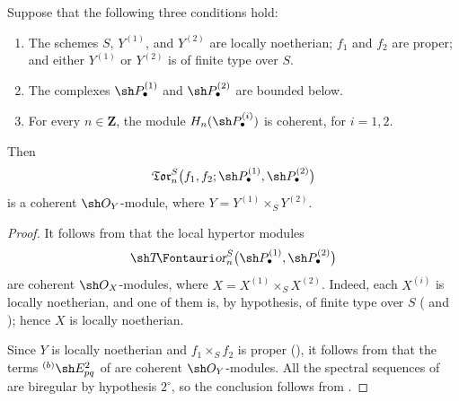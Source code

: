 \begin{proposition}[6.7.9]
\label{III.6.7.9}
Suppose that the following three conditions hold:
\begin{enumerate}
  \item[{$1^\circ$}]
    The schemes $S$, $Y^{(1)}$, and $Y^{(2)}$ are locally
    noetherian; $f_1$ and $f_2$ are proper; and either
    $Y^{(1)}$ or $Y^{(2)}$ is of finite type over $S$.
  \item[{$2^\circ$}]
    The complexes $\sh P_\bullet^{(1)}$ and
    $\sh P_\bullet^{(2)}$ are bounded below.
  \item[{$3^\circ$}]
    For every $n\in\mathbf Z$, the module
    $H_n(\sh P_\bullet^{(i)})$ is coherent, for $i=1,2$.
\end{enumerate}
Then
\[
  \mathfrak{Tor}_n^S
  \bigl(
    f_1,f_2;
    \sh P_\bullet^{(1)},\sh P_\bullet^{(2)}
  \bigr)
\]
is a coherent $\sh O_Y$-module, where
$Y=Y^{(1)}\times_SY^{(2)}$.
\end{proposition}

\begin{proof}
It follows from  that the local hypertor modules
\[
  \shTor_n^S
  \bigl(
    \sh P_\bullet^{(1)},\sh P_\bullet^{(2)}
  \bigr)
\]
are coherent $\sh O_X$-modules, where
$X=X^{(1)}\times_SX^{(2)}$.  Indeed, each $X^{(i)}$ is locally
noetherian, and one of them is, by hypothesis, of finite type over
$S$ ( and ); hence $X$ is
locally noetherian.

Since $Y$ is locally noetherian and
$f_1\times_Sf_2$ is proper (), it follows from
 that the terms ${}^{(b)}\sh E_{pq}^2$ of
 are coherent $\sh O_Y$-modules.  All the spectral
sequences of  are biregular by hypothesis
$2^\circ$, so the conclusion follows from
.
\end{proof}


